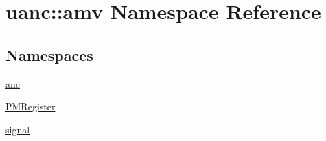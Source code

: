 \hypertarget{namespaceuanc_1_1amv}{}\section{uanc\+:\+:amv Namespace Reference}
\label{namespaceuanc_1_1amv}
\subsection*{Namespaces}
\begin{DoxyCompactItemize}
\item 
 \hyperlink{namespaceuanc_1_1amv_1_1anc}{anc}
\item 
 \hyperlink{namespaceuanc_1_1amv_1_1_p_m_register}{P\+M\+Register}
\item 
 \hyperlink{namespaceuanc_1_1amv_1_1signal}{signal}
\end{DoxyCompactItemize}
